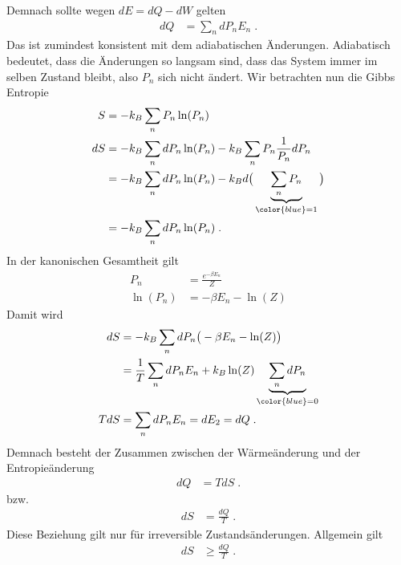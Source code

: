 Demnach sollte wegen $dE = dQ - dW$ gelten
\begin{align*}
dQ &= \sum_{n} dP_{n} E_{n}\;.
\end{align*}
Das ist zumindest konsistent mit dem adiabatischen Änderungen. Adiabatisch bedeutet, dass die Änderungen so langsam sind, dass das System immer im selben Zustand bleibt, also
$P_{n}$ sich nicht ändert.
Wir betrachten nun die Gibbs Entropie
\begin{align*}
S &= -k_{B} \sum_{n} P_{n} \ln(P_{n})\\
dS &= -k_{B} \sum_{n} dP_{n} \ln(P_{n})
-k_{B} \sum_{n} P_{n} \frac{1}{P_{n}} dP_{n}\\
&= -k_{B} \sum_{n} dP_{n} \ln(P_{n})
-k_{B} d \big(\underbrace{
\sum_{n} P_{n}
}_{\color{blue} = 1}\big)\\
&= -k_{B} \sum_{n} dP_{n} \ln(P_{n})\;.
\end{align*}
In der kanonischen Gesamtheit gilt
\begin{align*}
P_{n} &=\frac{ e^{-\beta E_{n}}}{Z}\\
\ln(P_{n}) &= -\beta E_{n} - \ln(Z) 
\end{align*}
Damit wird
\begin{align*}
dS &= -k_{B} \sum_{n} dP_{n} \big(
-\beta E_{n} - \ln(Z)
\big)\\
&= \frac{1}{T} \sum_{n} dP_{n} E_{n} + k_{B} \ln(Z) \underbrace{
\sum_{n} dP_{n}
}_{\color{blue} = 0}\\
T dS&= \sum_{n} dP_{n} E_{n} = dE_{2} = dQ\;.
\end{align*}
Demnach besteht der Zusammen zwischen der Wärmeänderung und der Entropieänderung
\begin{align*}
dQ &= TdS\;.
\end{align*}
bzw. 
\begin{align*}
dS &=\frac{dQ}{T}\;.
\end{align*}
Diese Beziehung gilt nur für irreversible Zustandsänderungen. Allgemein gilt
\begin{align*}
dS &\ge \frac{dQ}{T}\;.
\end{align*}